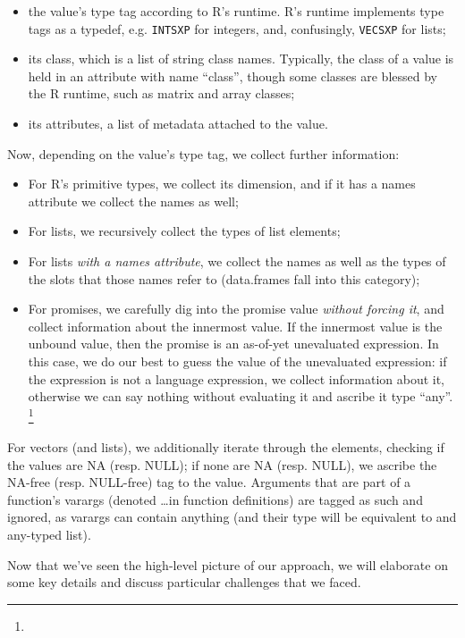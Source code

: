 \documentclass[acmsmall,review,anonymous]{acmart}\settopmatter{printfolios=true,printccs=false,printacmref=false}
\newcommand{\code}[1]{{\lstinline[style=Rin]!#1!}\xspace}
\begin{document}
\begin{itemize}
\item the value's type tag according to R's runtime. R's runtime implements type tags as a typedef, e.g. \code{INTSXP} for integers, and, confusingly, \code{VECSXP} for lists;
\item its class, which is a list of string class names. Typically, the class of a value is held in an attribute with name ``class'', though some classes are blessed by the R runtime, such as matrix and array classes;
\item its attributes, a list of metadata attached to the value.
\end{itemize}

Now, depending on the value's type tag, we collect further information:

\begin{itemize}
\item For R's primitive types, we collect its dimension, and if it has a names attribute we collect the names as well;
\item For lists, we recursively collect the types of list elements;
\item For lists {\it with a names attribute}, we collect the names as well as the types of the slots that those names refer to (data.frames fall into this category);
\item For promises, we carefully dig into the promise value {\it without forcing it}, and collect information about the innermost value. If the innermost value is the unbound value, then the promise is an as-of-yet unevaluated expression. In this case, we do our best to guess the value of the unevaluated expression: if the expression is not a language expression, we collect information about it, otherwise we can say nothing without evaluating it and ascribe it type ``any''. \footnote{}  
\end{itemize}

For vectors (and lists), we additionally iterate through the elements, checking if the values are NA (resp. NULL); if none are NA (resp. NULL), we ascribe the NA-free (resp. NULL-free) tag to the value.
Arguments that are part of a function's varargs (denoted \ldots in function definitions) are tagged as such and ignored, as varargs can contain anything (and their type will be equivalent to and any-typed list).  

Now that we've seen the high-level picture of our approach, we will elaborate on some key details and discuss particular challenges that we faced.
\end{document}
